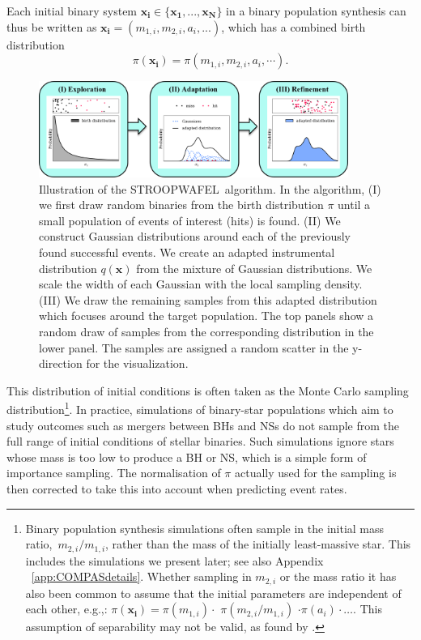 \documentclass[a4paper,fleqn,usenatbib,useAMS,usedcolumn]{mnras}
\newcommand{\AISs}{\textsc{STROOPWAFEL}}
\begin{document}
Each initial binary system $\boldsymbol{x_i} \in \{ \boldsymbol{x_1}, ...,\boldsymbol{x_N} \} $ in a binary population synthesis can thus be written as $\boldsymbol{x_i} = (m_{1,i}, m_{2,i}, a_i, ...)$, which has a combined birth distribution 
%
\begin{equation}
	\pi(\boldsymbol{x_i}) = \pi({m_{1,i}}, m_{2,i}, {a_i},   \cdots).
	\label{eq:prior-3d} 
\end{equation} 
%
\begin{figure}
	\includegraphics[width=0.9\textwidth]{STROOPWAFELCartoonHorizontalFlow.png}
    \caption{
    Illustration of the \AISs \ algorithm.  In the algorithm, (I)  we first draw random binaries from the birth distribution $\pi$  until a small population of events of interest (hits)  is found. (II)   We construct Gaussian distributions around each of the previously found successful events.  We create an adapted instrumental distribution $q(\boldsymbol{x})$   from  the mixture of Gaussian distributions. We scale the width of each Gaussian with the local sampling density. (III) We draw the remaining  samples from this adapted distribution which focuses  around the target population. The top panels show a random draw of samples from the corresponding distribution in the lower panel. The samples are assigned a random scatter in the y-direction for the visualization.}
    \label{fig:aIS_scheme}
\end{figure}
%
This distribution of initial conditions is often taken as the Monte Carlo sampling distribution\footnote{Binary population synthesis simulations  often sample in the initial mass ratio,~$m_{2,i} / m_{1,i}$,  rather than the mass of the initially least-massive star. This includes the simulations we present later; see also Appendix ~\ref{app:COMPASdetails}. Whether sampling in $m_{2,i}$ or the mass ratio it has also been common to assume that the initial parameters are independent of each other, e.g.,:  $\pi(\boldsymbol{x_i}) = \pi({m_{1,i}}) \cdot$ $\pi({m_{2,i}} / m_{1,i})$ $\cdot  \pi({a_i}) \cdot \hdots $.  \newline This assumption of separability may not be valid, as found by \citet{1990ApJS...74..551A,2017ApJS..230...15M, 2018A&A...619A..77K}.}.   
In practice, simulations of binary-star populations which aim to study outcomes such as mergers between BHs and NSs do not sample from the full range of initial conditions of stellar binaries.  Such simulations ignore stars whose mass is too low to produce a BH or NS, which is a simple form of importance sampling.  The normalisation of $\pi$ actually used for the sampling is then corrected to take this into account when predicting event rates. 
\end{document}
